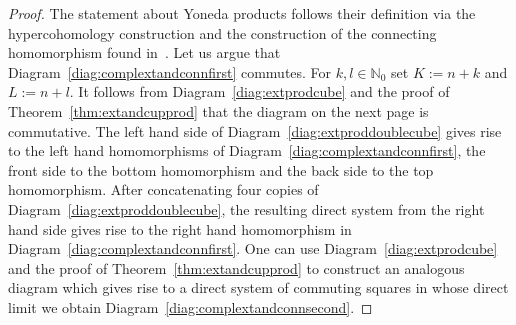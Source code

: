 \documentclass[12pt, a4paper]{article}
\numberwithin{equation}{section}
\theoremstyle{empty}
\theoremstyle{nonumberplain}
\newtheorem{proof}{Proof}
\begin{document}
\begin{proof}
The statement about Yoneda products follows their definition via the hypercohomology construction and the construction of the connecting homomorphism found in~\cite[Definition~6.6]{ghe24}. Let us argue that Diagram~\ref{diag:complextandconnfirst} commutes. For $k, l \in \mathbb{N}_0$ set $K := n+k$ and $L := n+l$. It follows from Diagram~\ref{diag:extprodcube} and the proof of Theorem~\ref{thm:extandcupprod} that the diagram on the next page is commutative. The left hand side of Diagram~\ref{diag:extproddoublecube} gives rise to the left hand homomorphisms of Diagram~\ref{diag:complextandconnfirst}, the front side to the bottom homomorphism and the  back side to the top homomorphism. After concatenating four copies of Diagram~\ref{diag:extproddoublecube}, the resulting direct system from the right hand side gives rise to the right hand homomorphism in Diagram~\ref{diag:complextandconnfirst}. One can use Diagram~\ref{diag:extprodcube} and the proof of Theorem~\ref{thm:extandcupprod} to construct an analogous diagram which gives rise to a direct system of commuting squares in whose direct limit we obtain Diagram~\ref{diag:complextandconnsecond}.
\end{proof}\pagebreak
\end{document}
